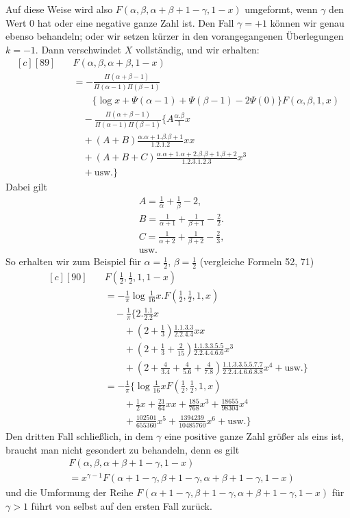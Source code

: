 Auf diese Weise wird also $F(\alpha,\beta,\alpha+\beta+1-\gamma,1-x)$ umgeformt, wenn $\gamma$ den Wert $0$ hat oder eine negative ganze Zahl ist. Den Fall $\gamma=+1$ können wir genau ebenso behandeln; oder wir setzen kürzer in den vorangegangenen Überlegungen $k=-1$. Dann verschwindet $X$ vollständig, und wir erhalten:
\[
\begin{aligned}[c]
[89]\quad &F(\alpha,\beta,\alpha+\beta,1-x)\\
&=-\frac{\Pi(\alpha+\beta-1)}{\Pi(\alpha-1)\Pi(\beta-1)}
\\&\qquad\{\log x+\Psi(\alpha-1)+\Psi(\beta-1)-2\Psi(0)\}F(\alpha,\beta,1,x)\\
&\quad-\frac{\Pi(\alpha+\beta-1)}{\Pi(\alpha-1)\Pi(\beta-1)}
\{A\frac{\alpha.\beta}{1}x\\
&\quad+(A+B)\frac{\alpha.\alpha+1.\beta.\beta+1}{1.2.1.2}xx\\
&\quad+(A+B+C)\frac{\alpha.\alpha+1.\alpha+2.\beta.\beta+1.\beta+2}{1.2.3.1.2.3}x^3\\
&\quad+\text{usw.}\}
\end{aligned}
\]
Dabei gilt
\[
\begin{aligned}&A=\frac1\alpha+\frac1\beta-2,\\&
B=\frac1{\alpha+1}+\frac1{\beta+1}-\frac22.\\&
C=\frac1{\alpha+2}+\frac1{\beta+2}-\frac23,\\&\text{usw.}\end{aligned}
\]
So erhalten wir zum Beispiel für $\alpha=\frac12$, $\beta=\frac12$ (vergleiche Formeln 52, 71)
\[
\begin{aligned}[c]
[90]\quad &F(\tfrac12,\tfrac12,1,1-x)\\
&=-\frac1\pi\log\tfrac1{16}x. F(\tfrac12,\tfrac12,1,x)\\
&\quad-\frac1\pi\{2.\frac{1.1}{2.2}x
\\&\qquad+(2+\tfrac13)\frac{1.1.3.3}{2.2.4.4}xx
\\&\qquad+(2+\tfrac13+\tfrac2{15})\frac{1.1.3.3.5.5}{2.2.4.4.6.6}x^3\\
&\qquad+(2+\tfrac4{3.4}+\tfrac4{5.6}+\tfrac4{7.8})
\frac{1.1.3.3.5.5.7.7}{2.2.4.4.6.6.8.8}x^4+\text{usw.}\}\\
&=-\frac1\pi\{\log\tfrac1{16}xF(\tfrac12,\tfrac12,1,x)
\\&\qquad+\tfrac12x+\tfrac{21}{64}xx+\tfrac{185}{768}x^3+\tfrac{18655}{98304}x^4\\
&\qquad+\tfrac{102501}{655360}x^5+\tfrac{1394239}{10485760}x^6+\text{usw.}\}
\end{aligned}
\]
Den dritten Fall schließlich, in dem $\gamma$ eine positive ganze Zahl größer als eins ist, braucht man nicht gesondert zu behandeln, denn es gilt
\[
\begin{aligned}&F(\alpha,\beta,\alpha+\beta+1-\gamma,1-x)\\&=x^{\gamma-1}F(\alpha+1-\gamma,\beta+1-\gamma,\alpha+\beta+1-\gamma,1-x)\end{aligned}
\]
und die Umformung der Reihe $F(\alpha+1-\gamma,\beta+1-\gamma,\alpha+\beta+1-\gamma,1-x)$ für $\gamma>1$ führt von selbst auf den ersten Fall zurück.

